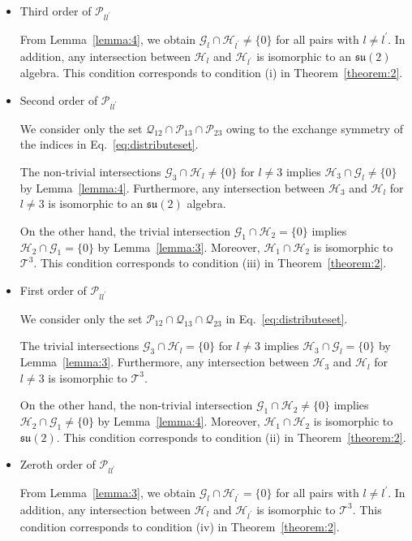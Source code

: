 \documentclass[aps,showpacs,amsmath,amssymb,twocolumn,prx,longbibliography,superscriptaddress,notitlepage,floatfix,10pt]{revtex4-2}
\begin{document}
\begin{itemize}
    \item
    Third order of $\mathcal{P}_{ll^{\prime}}$

From Lemma~\ref{lemma:4}, we obtain $\mathcal{G}_{l}\cap\mathcal{H}_{l^{\prime}}\neq\{0\}$ for all pairs with $l\neq l^{\prime}$. In addition, any intersection between $\mathcal{H}_{l}$ and $\mathcal{H}_{l^{\prime}}$ is isomorphic to an $\mathfrak{su}(2)$ algebra. This condition corresponds to condition (i) in Theorem~\ref{theorem:2}.
    
    \item Second order of $\mathcal{P}_{ll^{\prime}}$

We consider only the set $\mathcal{Q}_{12}\cap \mathcal{P}_{13}\cap \mathcal{P}_{23}$ owing to the exchange symmetry of the indices in Eq.~\eqref{eq:distributeset}. 

The non-trivial intersections $\mathcal{G}_{3}\cap\mathcal{H}_{l}\neq\{0\}$ for $l\neq3$ implies $\mathcal{H}_{3}\cap\mathcal{G}_{l}\neq\{0\}$ by Lemma~\ref{lemma:4}. Furthermore, any intersection between $\mathcal{H}_{3}$ and $\mathcal{H}_{l}$ for $l\neq3$ is isomorphic to an $\mathfrak{su}(2)$ algebra.

On the other hand, the trivial intersection $\mathcal{G}_{1}\cap\mathcal{H}_{2}=\{0\}$ implies $\mathcal{H}_{2}\cap\mathcal{G}_{1}=\{0\}$ by Lemma~\ref{lemma:3}. Moreover, $\mathcal{H}_{1}\cap\mathcal{H}_{2}$ is isomorphic to $\mathcal{T}^{3}$. This condition corresponds to condition (iii) in Theorem~\ref{theorem:2}.

    \item First order of $\mathcal{P}_{ll^{\prime}}$

We consider only the set $\mathcal{P}_{12}\cap \mathcal{Q}_{13}\cap \mathcal{Q}_{23}$ in Eq.~\eqref{eq:distributeset}. 

The trivial intersections $\mathcal{G}_{3}\cap\mathcal{H}_{l}=\{0\}$ for $l\neq3$ implies $\mathcal{H}_{3}\cap\mathcal{G}_{l}=\{0\}$ by Lemma~\ref{lemma:3}. Furthermore, any intersection between $\mathcal{H}_{3}$ and $\mathcal{H}_{l}$ for $l\neq3$ is isomorphic to $\mathcal{T}^3$.

On the other hand, the non-trivial intersection $\mathcal{G}_{1}\cap\mathcal{H}_{2}\neq\{0\}$ implies $\mathcal{H}_{2}\cap\mathcal{G}_{1}\neq\{0\}$ by Lemma~\ref{lemma:4}. Moreover, $\mathcal{H}_{1}\cap\mathcal{H}_{2}$ is isomorphic to $\mathfrak{su}(2)$. This condition corresponds to condition (ii) in Theorem~\ref{theorem:2}.

    \item Zeroth order of $\mathcal{P}_{ll^{\prime}}$

From Lemma~\ref{lemma:3}, we obtain $\mathcal{G}_{l}\cap\mathcal{H}_{l^{\prime}}=\{0\}$ for all pairs with $l\neq l^{\prime}$. In addition, any intersection between $\mathcal{H}_{l}$ and $\mathcal{H}_{l^{\prime}}$ is isomorphic to $\mathcal{T}^{3}$. This condition corresponds to condition (iv) in Theorem~\ref{theorem:2}.

\qedsymbol
\end{itemize}
\end{document}
